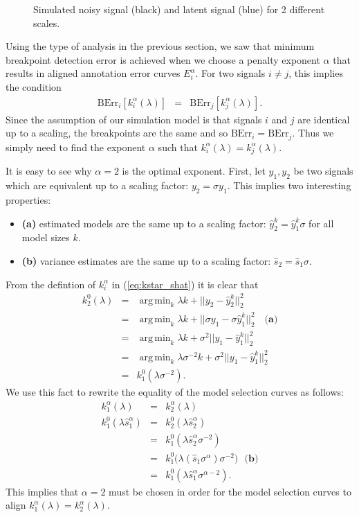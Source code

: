 \documentclass{jsfds} %
\newcommand{\fig}[3][H]{
  \begin{figure}[#1]
    \hskip -1cm
    
    \caption{#3}
    \label{fig:#2}
  \end{figure}
}
\DeclareMathOperator*{\argmin}{arg\,min}
\begin{document}
\fig{variable-scale-signals}{Simulated noisy signal (black) and latent
  signal (blue) for 2 different scales.}

\newpage
Using the type of analysis in the previous section, we saw that
minimum breakpoint detection error is achieved when we choose a
penalty exponent $\alpha$ that results in aligned annotation error
curves $E_i^\alpha$. For two signals $i\neq j$, this implies the
condition
\begin{eqnarray}
  \label{eq:equal_err}
  \text{BErr}_i[k^\alpha_i(\lambda)]&=&  
  \text{BErr}_j[k^\alpha_j(\lambda)].
\end{eqnarray}
Since the assumption of our simulation model is that signals $i$ and
$j$ are identical up to a scaling, the breakpoints are the same and so
$\text{BErr}_i=\text{BErr}_j$. Thus we simply need to find the 
exponent $\alpha$ such that $k^\alpha_i(\lambda)=k^\alpha_j(\lambda)$.

It is easy to see why $\alpha=2$ is the optimal exponent. First, let
$y_1,y_2$ be two signals which are equivalent up to a scaling factor:
$y_2=\sigma y_1$. This implies two interesting properties:
\begin{itemize}
\item \textbf{(a)} estimated models are the same up to a scaling
  factor: $\hat y_2^k = \hat y_1^k\sigma$ for all model sizes $k$.
\item \textbf{(b)} variance estimates are the same up to a scaling factor:
  $\hat s_2 = \hat s_1 \sigma$.
\end{itemize}
From the defintion of $k^\alpha_i$ in (\ref{eq:kstar_shat}) it
is clear that
\begin{eqnarray*}
  \label{eq:k2=k1}
  k^0_2(\lambda) 
&=& \argmin_k \lambda k + ||y_2 - \hat y_2^k||_2^2\\
&=&\argmin_k \lambda k + ||\sigma y_1 - \sigma \hat y_1^k||_2^2 
\ \ \ \textbf{ (a)}\\
&=&\argmin_k \lambda k + \sigma^2||y_1 - \hat y_1^k||_2^2\\
&=&\argmin_k \lambda\sigma^{-2} k+\sigma^2||y_1 - \hat y_1^k||_2^2\\
&=& k^0_1(\lambda \sigma^{-2}).
\end{eqnarray*}
We use this fact to rewrite the equality of the model selection curves
as follows:
\begin{eqnarray*}
  k_1^\alpha(\lambda) &=& k_2^\alpha(\lambda) \\
k_1^0(\lambda \hat s_1^\alpha) &=& k_2^0(\lambda \hat s_2^\alpha)\\
&=& k^0_1(\lambda\hat s_2^\alpha\sigma^{-2})\\
&=&k_1^0\big(\lambda(\hat s_1\sigma^\alpha)\sigma^{-2}\big)\ \ \ \textbf{(b)}\\
&=&k_1^0(\lambda\hat s_1^\alpha \sigma^{\alpha-2}).
\end{eqnarray*}
This implies that $\alpha=2$ must be chosen in order for the model
selection curves to align $k_1^\alpha(\lambda)=k_2^\alpha(\lambda)$.
\end{document}
